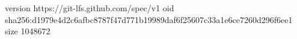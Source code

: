 version https://git-lfs.github.com/spec/v1
oid sha256:d1979e4d2c6afbc8787f47d771b19989daf6f25607c33a1e6ce7260d296f6ee1
size 1048672
